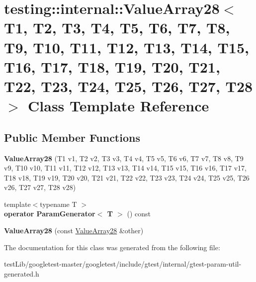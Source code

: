 \hypertarget{classtesting_1_1internal_1_1ValueArray28}{}\section{testing\+:\+:internal\+:\+:Value\+Array28$<$ T1, T2, T3, T4, T5, T6, T7, T8, T9, T10, T11, T12, T13, T14, T15, T16, T17, T18, T19, T20, T21, T22, T23, T24, T25, T26, T27, T28 $>$ Class Template Reference}
\label{classtesting_1_1internal_1_1ValueArray28}
\subsection*{Public Member Functions}
\begin{DoxyCompactItemize}
\item 
\mbox{\label{classtesting_1_1internal_1_1ValueArray28_a5d8e6b5ec2753a95857e57a713d034c4}} 
{\bfseries Value\+Array28} (T1 v1, T2 v2, T3 v3, T4 v4, T5 v5, T6 v6, T7 v7, T8 v8, T9 v9, T10 v10, T11 v11, T12 v12, T13 v13, T14 v14, T15 v15, T16 v16, T17 v17, T18 v18, T19 v19, T20 v20, T21 v21, T22 v22, T23 v23, T24 v24, T25 v25, T26 v26, T27 v27, T28 v28)
\item 
\mbox{\label{classtesting_1_1internal_1_1ValueArray28_a8164f1537b7e640ef17be3d70e65c448}} 
{\footnotesize template$<$typename T $>$ }\\{\bfseries operator Param\+Generator$<$ T $>$} () const
\item 
\mbox{\label{classtesting_1_1internal_1_1ValueArray28_abd9c216c57cf10dfc4690630f18926f4}} 
{\bfseries Value\+Array28} (const \hyperlink{classtesting_1_1internal_1_1ValueArray28}{Value\+Array28} \&other)
\end{DoxyCompactItemize}


The documentation for this class was generated from the following file\+:\begin{DoxyCompactItemize}
\item 
test\+Lib/googletest-\/master/googletest/include/gtest/internal/gtest-\/param-\/util-\/generated.\+h\end{DoxyCompactItemize}
